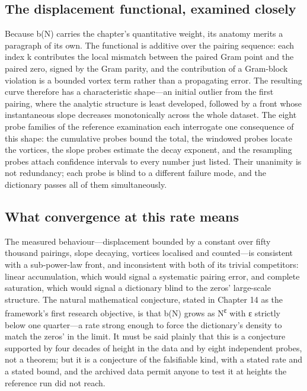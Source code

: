 \documentclass[10pt]{article}
\begin{document}
\subsection{The displacement functional, examined closely}\label{sec:44}
Because b(N) carries the chapter's quantitative weight, its anatomy merits a paragraph of its own. The functional is additive over the pairing sequence: each index k contributes the local mismatch between the paired Gram point and the paired zero, signed by the Gram parity, and the contribution of a Gram-block violation is a bounded vortex term rather than a propagating error. The resulting curve therefore has a characteristic shape---an initial outlier from the first pairing, where the analytic structure is least developed, followed by a front whose instantaneous slope decreases monotonically across the whole dataset. The eight probe families of the reference examination each interrogate one consequence of this shape: the cumulative probes bound the total, the windowed probes locate the vortices, the slope probes estimate the decay exponent, and the resampling probes attach confidence intervals to every number just listed. Their unanimity is not redundancy; each probe is blind to a different failure mode, and the dictionary passes all of them simultaneously.

\subsection{What convergence at this rate means}\label{sec:45}
The measured behaviour---displacement bounded by a constant over fifty thousand pairings, slope decaying, vortices localised and counted---is consistent with a sub-power-law front, and inconsistent with both of its trivial competitors: linear accumulation, which would signal a systematic pairing error, and complete saturation, which would signal a dictionary blind to the zeros' large-scale structure. The natural mathematical conjecture, stated in Chapter 14 as the framework's first research objective, is that b(N) grows as N\textsuperscript{ε} with ε strictly below one quarter---a rate strong enough to force the dictionary's density to match the zeros' in the limit. It must be said plainly that this is a conjecture supported by four decades of height in the data and by eight independent probes, not a theorem; but it is a conjecture of the falsifiable kind, with a stated rate and a stated bound, and the archived data permit anyone to test it at heights the reference run did not reach.
\end{document}
